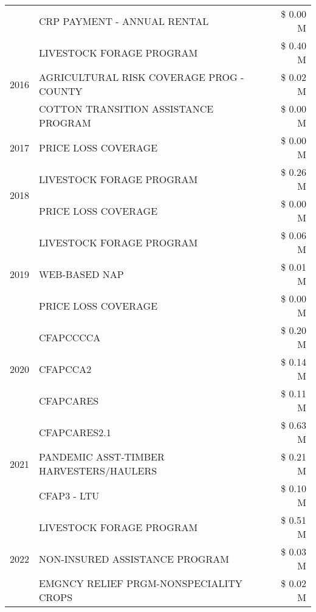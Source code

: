 \begin{tabular}{llr}
 & CRP PAYMENT - ANNUAL RENTAL & \$ 0.00 M \\
\cline{1-3}
\multirow[t]{3}{*}{2016} & LIVESTOCK FORAGE PROGRAM & \$ 0.40 M \\
 & AGRICULTURAL RISK COVERAGE PROG - COUNTY & \$ 0.02 M \\
 & COTTON TRANSITION ASSISTANCE PROGRAM & \$ 0.00 M \\
\cline{1-3}
2017 & PRICE LOSS COVERAGE & \$ 0.00 M \\
\cline{1-3}
\multirow[t]{2}{*}{2018} & LIVESTOCK FORAGE PROGRAM & \$ 0.26 M \\
 & PRICE LOSS COVERAGE & \$ 0.00 M \\
\cline{1-3}
\multirow[t]{3}{*}{2019} & LIVESTOCK FORAGE PROGRAM & \$ 0.06 M \\
 & WEB-BASED NAP & \$ 0.01 M \\
 & PRICE LOSS COVERAGE & \$ 0.00 M \\
\cline{1-3}
\multirow[t]{3}{*}{2020} & CFAPCCCCA & \$ 0.20 M \\
 & CFAPCCA2 & \$ 0.14 M \\
 & CFAPCARES & \$ 0.11 M \\
\cline{1-3}
\multirow[t]{3}{*}{2021} & CFAPCARES2.1 & \$ 0.63 M \\
 & PANDEMIC ASST-TIMBER HARVESTERS/HAULERS & \$ 0.21 M \\
 & CFAP3 - LTU & \$ 0.10 M \\
\cline{1-3}
\multirow[t]{3}{*}{2022} & LIVESTOCK FORAGE PROGRAM & \$ 0.51 M \\
 & NON-INSURED ASSISTANCE PROGRAM & \$ 0.03 M \\
 & EMGNCY RELIEF PRGM-NONSPECIALITY CROPS & \$ 0.02 M \\
\cline{1-3}
\bottomrule
\end{tabular}

